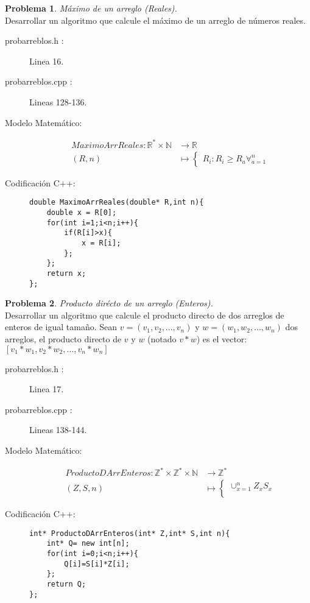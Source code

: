 \documentclass{article}
\theoremstyle{plain}
\theoremstyle{definition}
\newtheorem{problem}{Problema}
\begin{document}
\begin{problem} \emph{Máximo de un arreglo (Reales).}\\
\hspace*{7mm}Desarrollar un algoritmo que calcule el máximo de un arreglo de números reales. 
\begin{description}
\item[probarreblos.h :] Linea 16. \item[probarreblos.cpp :] Lineas 128-136.

\item[Modelo Matemático:]
\begin{align*}
MaximoArrReales: \mathbb{R}^{*}\times\mathbb{N} &\to \mathbb{R}\\
(R,n) &\mapsto
\begin{cases}
R_i: R_i \geq R_a \forall_{a=1}^n 
\end{cases}
\end{align*}
%
\item[Codificación \textsf{C++}:]\hfill
%
\begin{verbatim}
double MaximoArrReales(double* R,int n){
    double x = R[0];
    for(int i=1;i<n;i++){
        if(R[i]>x){
            x = R[i];
        };
    };
    return x;
};
\end{verbatim}
\end{description}
\end{problem}

\begin{problem} \emph{Producto dirécto de un arreglo (Enteros).}\\
\hspace*{7mm}Desarrollar un algoritmo que calcule el producto directo de dos arreglos de enteros de igual tamaño. Sean $v=(v_1,v_2,..., v_n)$ y $w=(w_1,w_2,..., w_n)$ dos arreglos, el producto directo de $v$ y $w$ (notado $v*w$) es el vector: $[v_1 * w_1 , v_2*w_2 ,..., v_n * w_n]$
\begin{description}
\item[probarreblos.h :] Linea 17. \item[probarreblos.cpp :] Lineas 138-144.

\item[Modelo Matemático:]
\begin{align*}
ProductoDArrEnteros: \mathbb{Z}^{*}\times\mathbb{Z}^{*}\times\mathbb{N} &\to \mathbb{Z}^{*}\\
(Z,S,n) &\mapsto
\begin{cases}
\cup_{x=1}^n Z_xS_x\\
\end{cases}
\end{align*}
%
\item[Codificación \textsf{C++}:]\hfill
%
\begin{verbatim}
int* ProductoDArrEnteros(int* Z,int* S,int n){
    int* Q= new int[n];
    for(int i=0;i<n;i++){
        Q[i]=S[i]*Z[i];
    };
    return Q;
};
\end{verbatim}
\end{description}
\end{problem}
\end{document}
